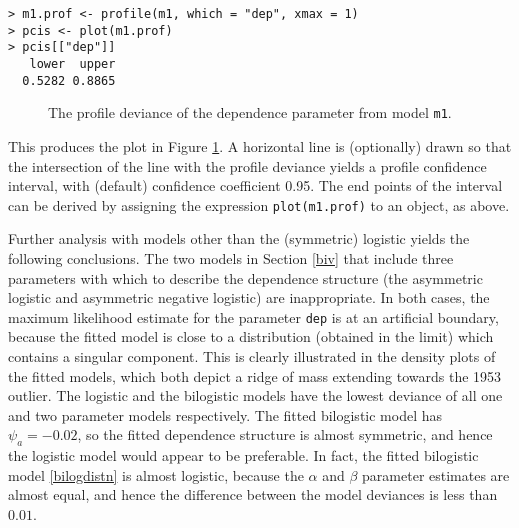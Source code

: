 \documentclass[11pt,a4paper]{article}
\begin{document}
\begin{verbatim}
> m1.prof <- profile(m1, which = "dep", xmax = 1)
> pcis <- plot(m1.prof)
> pcis[["dep"]]
   lower  upper 
  0.5282 0.8865
\end{verbatim}

\begin{figure}
\begin{center}
\vspace{-1.5cm}
\end{center} 
\caption{The profile deviance of the dependence parameter from model \texttt{m1}.}
\label{seaprof}
\end{figure}

This produces the plot in Figure \ref{seaprof}. 
A horizontal line is (optionally) drawn so that the intersection of the line with the profile deviance yields a profile confidence interval, with (default) confidence coefficient 0.95.
The end points of the interval can be derived by assigning the expression \verb+plot(m1.prof)+ to an object, as above.

Further analysis with models other than the (symmetric) logistic yields the following conclusions.
The two models in Section \ref{biv} that include three parameters with which to describe the dependence structure (the asymmetric logistic and asymmetric negative logistic) are inappropriate.
In both cases, the maximum likelihood estimate for the parameter \verb+dep+ is at an artificial boundary, because the fitted model is close to a distribution (obtained in the limit) which contains a singular component.
This is clearly illustrated in the density plots of the fitted models, which both depict a ridge of mass extending towards the 1953 outlier.
The logistic and the bilogistic models have the lowest deviance of all one and two parameter models respectively.
The fitted bilogistic model has $\psi_a = -0.02$, so the fitted dependence structure is almost symmetric, and hence the logistic model would appear to be preferable.
In fact, the fitted bilogistic model \eqref{bilogdistn} is almost logistic, because the $\alpha$ and $\beta$ parameter estimates are almost equal, and hence the difference between the model deviances is less than $0.01$.


\end{document}
